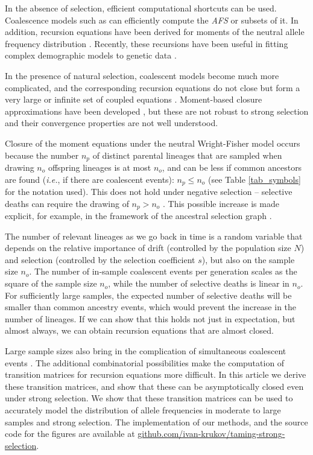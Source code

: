\documentclass[review,nonatbib]{elsarticle}
\begin{document}
In the absence of selection, efficient computational shortcuts can be used. Coalescence models such
as \citep{fastsimcoal2, KammEtAl2017} can efficiently compute the \textit{AFS} or subsets of it. In
addition, recursion equations have been derived for moments of the neutral allele frequency
distribution \citep{KimuraCrow1964,Ewens1972,JouganousEtAl2017}. Recently, these recursions have
been useful in fitting complex demographic models to genetic data
\citep{JouganousEtAl2017,KammEtAl2017}.
 
In the presence of natural selection, coalescent models become much more complicated, and the
corresponding recursion equations do not close but
form a very large or infinite set of coupled equations \citep{DonnellyKurtz1999, JouganousEtAl2017}. Moment-based closure approximations
have been developed \citep{JouganousEtAl2017}, but these are not robust to strong selection and
their convergence properties are not well understood.

Closure of the moment equations under the neutral Wright-Fisher model occurs because the number $n_p$ of
distinct parental lineages that are sampled when drawing $n_o$ offspring lineages is at most $n_o$,
and can be less if common ancestors are found (\textit{i.e.}, if there are coalescent events): 
$n_p \le n_o$ (see Table \ref{tab_symbols} for the notation used). This does not
hold under negative selection -- selective deaths can require the drawing of $n_p>n_o$  \citep{DonnellyKurtz1999a,
  JouganousEtAl2017}. This possible increase is made explicit, for example, in the framework of the ancestral
selection graph \citep{KroneNeuhauser1997}.

The number of relevant lineages as we go back in time is a random variable that depends on the relative
importance of drift (controlled by the population size $N$) and selection (controlled by the selection coefficient $s$), but also on the sample size $n_o$. 
The number of in-sample coalescent events per generation scales as the square of the sample size $n_o$,
while the number of selective deaths is linear in $n_o$. For sufficiently large
samples, the expected number of selective deaths will be smaller than common ancestry events, which would prevent the
increase in the number of lineages. If we can show that this holds not just in expectation, but almost always,  
we can obtain recursion equations that are almost closed. 
 
Large sample sizes also bring in the complication of simultaneous coalescent events
\citep{BhaskarEtAl2014}. The additional combinatorial possibilities make the computation of
transition matrices for recursion equations more difficult. In this article we derive these
transition matrices, and show that these can be asymptotically closed even under strong selection. We
show that these transition matrices can be used to accurately model the distribution of allele
frequencies in moderate to large samples and strong selection. The implementation of our methods,
and the source code for the figures are available at
\url{github.com/ivan-krukov/taming-strong-selection}.
\end{document}
